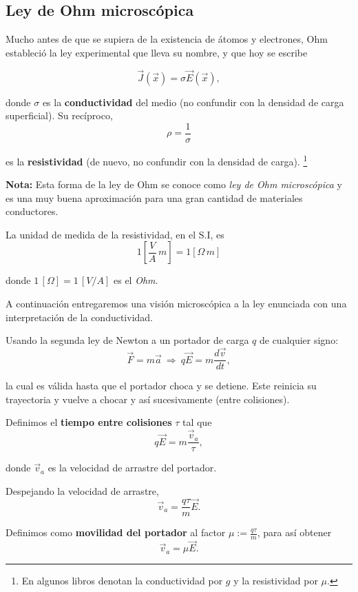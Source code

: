 \subsection{Ley de Ohm microscópica}

Mucho antes de que se supiera de la existencia de átomos y electrones, Ohm estableció la ley experimental que lleva su nombre, y que hoy se escribe
\begin{shaded}
\begin{equation}
      \Vec{J}(\Vec{x}) = \sigma \Vec{E}(\Vec{x}), \label{Ohm-Micro}  
\end{equation}
\end{shaded}

donde $\sigma$ es la \textbf{conductividad} del medio (no confundir con la densidad de carga superficial). Su recíproco,
$$\rho = \frac{1}{\sigma}$$

es la \textbf{resistividad} (de nuevo, no confundir con la densidad de carga). \footnote{En algunos libros denotan la conductividad por $g$ y la resistividad por $\mu$.}

\textbf{Nota:} Esta forma de la ley de Ohm se conoce como \textit{ley de Ohm microscópica} y es una muy buena aproximación para una gran cantidad de materiales conductores.

La unidad de medida de la resistividad, en el S.I, es
\begin{equation*}
1 \left[ \frac{V}{A}\,m \right] = 1 [\Omega \,m]
\end{equation*}

donde $1 \, [\Omega] = 1 \, [V/A]$ es el \textit{Ohm}. 

A continuación entregaremos una visión microscópica a la ley enunciada con una interpretación de la conductividad.

Usando la segunda ley de Newton a un portador de carga $q$ de cualquier signo:
$$\vec{F} = m\vec{a} ~\Rightarrow~ q\vec{E} = m \frac{d\vec{v}}{dt},$$

la cual es válida hasta que el portador choca y se detiene. Este reinicia su trayectoria y vuelve a chocar y así sucesivamente (entre colisiones).

Definimos el \textbf{tiempo entre colisiones} $\tau$ tal que 
$$q\vec{E} = m \frac{\vec{v}_a}{\tau},$$

donde $\vec{v}_a$ es la velocidad de arrastre del portador.

Despejando la velocidad de arrastre,
$$\vec{v}_a = \frac{q \tau}{m} \vec{E}.$$

Definimos como \textbf{movilidad del portador} al factor $\mu := \frac{q \tau}{m}$, para así obtener
$$\vec{v}_a = \mu \vec{E}.$$


